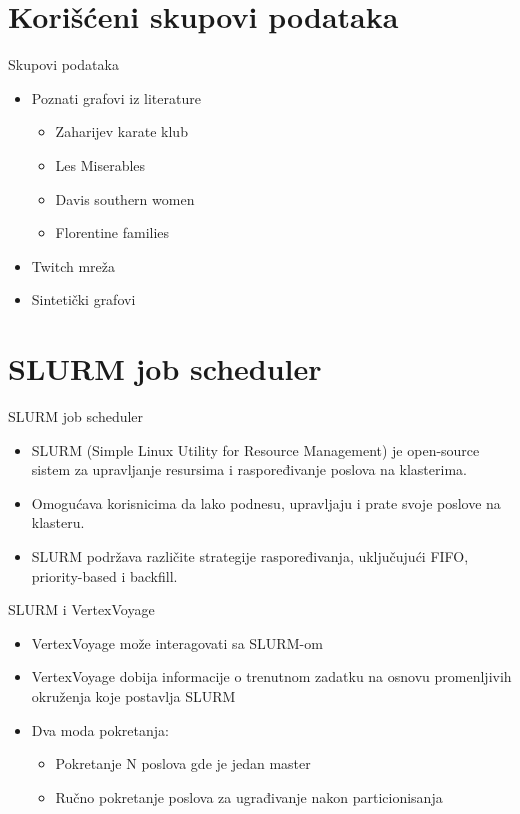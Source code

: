 \documentclass{beamer}
\begin{document}
\section{Korišćeni skupovi podataka}
\begin{frame}{Skupovi podataka}
    \begin{itemize}
        \item Poznati grafovi iz literature 
        \begin{itemize}
            \item Zaharijev karate klub
            \item Les Miserables
            \item Davis southern women
            \item Florentine families
        \end{itemize}
        \item Twitch mreža
        \item Sintetički grafovi 
    \end{itemize}
\end{frame}

\section{SLURM job scheduler}
\begin{frame}{SLURM job scheduler}
    \begin{itemize}
        \item SLURM (Simple Linux Utility for Resource Management) je open-source sistem za upravljanje resursima i raspoređivanje poslova na klasterima.
        \item Omogućava korisnicima da lako podnesu, upravljaju i prate svoje poslove na klasteru.
        \item SLURM podržava različite strategije raspoređivanja, uključujući FIFO, priority-based i backfill.
    \end{itemize}
\end{frame}

\begin{frame}{SLURM i VertexVoyage}
    \begin{itemize}
        \item VertexVoyage može interagovati sa SLURM-om
        \item VertexVoyage dobija informacije o trenutnom zadatku na osnovu promenljivih okruženja koje postavlja SLURM
        \item Dva moda pokretanja:
        \begin{itemize}
            \item Pokretanje N poslova gde je jedan master 
            \item Ručno pokretanje poslova za ugrađivanje nakon particionisanja
        \end{itemize}
    \end{itemize}
\end{frame}
\end{document}

